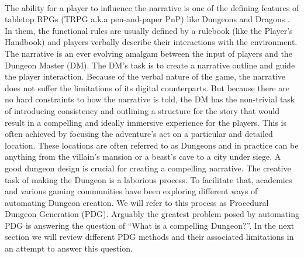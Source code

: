 \documentclass{UoYCSproject}
\begin{document}
\paragraph{}
The ability for a player to influence the narrative is one of the defining features of tabletop RPGs (TRPG a.k.a pen-and-paper PnP) like Dungeons and Dragons \parencite{DnD}. In them, the functional rules are usually defined by a rulebook (like the Player’s Handbook) and players verbally describe their interactions with the environment. The narrative is an ever evolving amalgam between the input of players and the Dungeon Master (DM). The DM’s task is to create a narrative outline and guide the player interaction. Because of the verbal nature of the game, the narrative does not suffer the limitations of its digital counterparts. But because there are no hard constraints to how the narrative is told, the DM has the non-trivial task of introducing consistency and outlining a structure for the story that would result in a compelling and ideally immersive experience for the players. This is often achieved by focusing the adventure’s act on a particular and detailed location. These locations are often referred to as Dungeons and in practice can be anything from the villain's mansion or a beast’s cave to a city under siege. A good dungeon design is crucial for creating a compelling narrative. The creative task of making the Dungeon is a laborious process. To facilitate that, academics and various gaming communities have been exploring different ways of automating Dungeon creation. We will refer to this process as Procedural Dungeon Generation (PDG). Arguably the greatest problem posed by automating PDG is answering the question of “What is a compelling Dungeon?”. In the next section we will review different PDG methods and their associated limitations in an attempt to answer this question.
\end{document}
